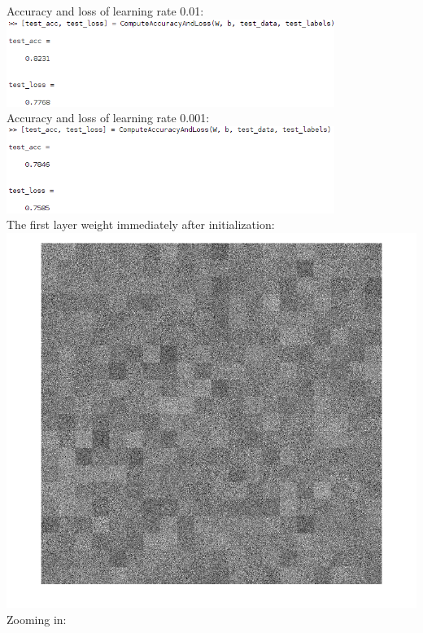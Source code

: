 \documentclass[12pt,letterpaper,boxed]{hmcpset}
\begin{document}
\begin{solution}
Accuracy and loss of learning rate 0.01:\\
\includegraphics[width=0.8\textwidth]{3_1_2_12.png}\\
Accuracy and loss of learning rate 0.001:\\
\includegraphics[width=0.8\textwidth]{3_1_2_13.png}\\
The first layer weight immediately after initialization:\\
\includegraphics[width=\textwidth]{3_1_3_1.png}\\
Zooming in:\\

\end{solution}
\end{document}
